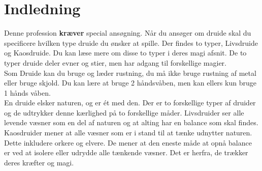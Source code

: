 
\chapter*{Indledning}

Denne profession \textbf{kræver} special ansøgning. Når du ansøger om druide skal du specificere hvilken type druide du ønsker at spille. Der findes to typer, Livsdruide og Kaosdruide. Du kan læse mere om disse to typer i deres magi afsnit.
De to typer druide deler evner og stier, men har adgang til forskellige magier.\\

Som Druide kan du bruge og læder rustning, du må ikke bruge rustning af metal eller bruge skjold. Du kan lære at bruge 2 håndsvåben, men kan ellers kun bruge 1 hånds våben.\\

En druide elsker naturen, og er ét med den. Der er to forskellige typer af druider og de udtrykker denne kærlighed på to forskellige måder. Livsdruider ser alle levende væsner som en del af naturen og at alting har en balance som skal findes. Kaosdruider mener at alle væsner som er i stand til at tænke udnytter naturen. Dette inkludere orkere og elvere. De mener at den eneste måde at opnå balance er ved at isolere eller udrydde alle tænkende væsner. Det er herfra, de trækker deres kræfter og magi. 